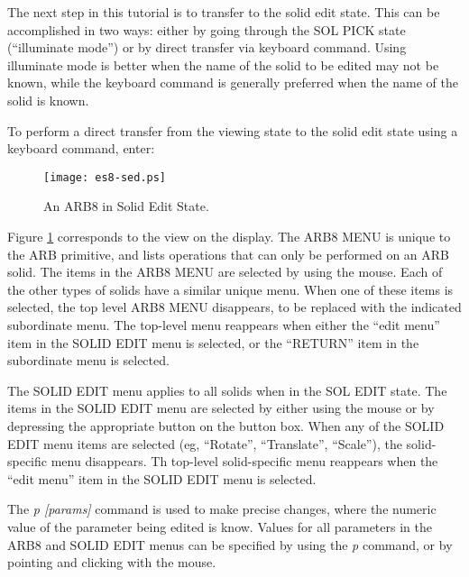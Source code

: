 The next step in this tutorial is to transfer to the solid edit state.
This can be accomplished in two ways:  either by going through
the SOL PICK state (``illuminate mode'') or by direct transfer via
keyboard command.
Using illuminate mode is better when the name of the solid to be
edited may not be known, while the keyboard command is generally
preferred when the name of the solid is known.


To perform a direct transfer from the viewing state to the solid edit state
using a keyboard command, enter:


\begin{figure}
\centering \texttt{[image: es8-sed.ps]}
\caption{An ARB8 in Solid Edit State.}
\label{es8-sed}
\end{figure}

Figure \ref{es8-sed} corresponds to the view on the display.
The ARB8 MENU is unique to the ARB primitive,
and lists operations that can only be performed on an ARB solid.
The items in the ARB8 MENU are
selected by using the mouse.
Each of the other types of solids have a
similar unique menu.
When one of these items is selected, the top level ARB8 MENU disappears,
to be replaced with the indicated subordinate menu.
The top-level menu reappears when either
the ``edit menu'' item in the SOLID EDIT menu is selected,
or the ``RETURN'' item in the subordinate menu is selected.

The  SOLID EDIT  menu applies to all
solids when in the SOL EDIT state.
The items in the  SOLID EDIT  menu are selected
by either using the mouse or by depressing the appropriate button on the
button box.
When any of the SOLID EDIT menu items are selected
(eg, ``Rotate'', ``Translate'', ``Scale''), the solid-specific menu
disappears.
Th top-level solid-specific menu reappears when
the ``edit menu'' item in the SOLID EDIT menu is selected.

The {\em p [params]} command is used to
make precise changes, where the numeric value of the parameter being
edited is know.
Values for all parameters in the ARB8
and SOLID EDIT menus can be specified by using the {\em p} command,
or by pointing and clicking with the mouse.

